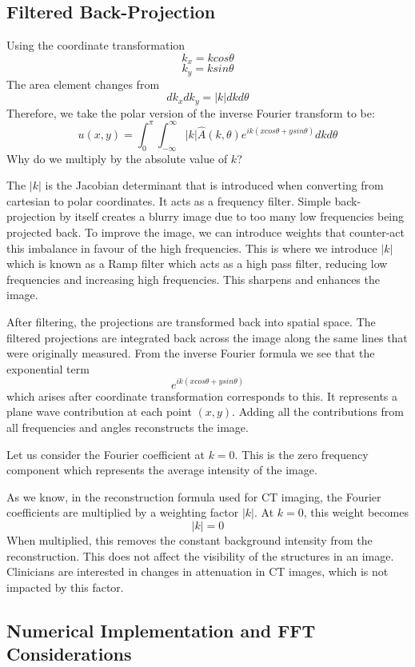 \documentclass{article}
\begin{document}
\subsection{Filtered Back-Projection}

Using the coordinate transformation 
\[k_x = kcos\theta\]
\[k_y = ksin\theta\]
The area element changes from
\[dk_x dk_y = |k|dkd\theta\]
Therefore, we take the polar version of the inverse Fourier transform to be: 
\[u(x,y) = \int^{\pi}_{0} \int^{\infty}_{-\infty} |k| \hat{A}(k,\theta)e^{ik(xcos\theta + ysin\theta)}dkd\theta\]
Why do we multiply by the absolute value of $k$?

The $|k|$ is the Jacobian determinant that is introduced when converting from cartesian to polar coordinates. It acts as a frequency filter. Simple back-projection by itself creates a blurry image due to too many low frequencies being projected back. To improve the image, we can introduce weights that counter-act this imbalance in favour of the high frequencies. This is where we introduce $|k|$ which is known as a Ramp filter which acts as a high pass filter, reducing low frequencies and increasing high frequencies. This sharpens and enhances the image. 

After filtering, the projections are transformed back into spatial space. The filtered projections are integrated back across the image along the same lines that were originally measured. From the inverse Fourier formula we see that the exponential term 
\[e^{ik(xcos\theta + ysin\theta)}\]
which arises after coordinate transformation corresponds to this. It represents a plane wave contribution at each point $(x,y)$. Adding all the contributions from all frequencies and angles reconstructs the image. \cite{Chapter8_ct}

Let us consider the Fourier coefficient at $k=0$. This is the zero frequency component which represents the average intensity of the image. 

As we know, in the reconstruction formula used for CT imaging, the Fourier coefficients are multiplied by a weighting factor $|k|$. At $k=0$, this weight becomes
\[|k| = 0\]
When multiplied, this removes the constant background intensity from the reconstruction. This does not affect the visibility of the structures in an image. Clinicians are interested in changes in attenuation in CT images, which is not impacted by this factor.


\subsection{Numerical Implementation and FFT Considerations}
\end{document}
